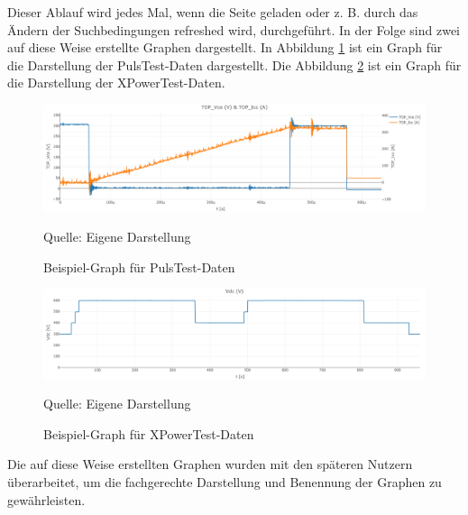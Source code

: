 Dieser Ablauf wird jedes Mal, wenn die Seite geladen oder z. B. durch das Ändern der Suchbedingungen refreshed wird, durchgeführt.
In der Folge sind zwei auf diese Weise erstellte Graphen dargestellt.
In Abbildung \ref{fig:Beispiel-Graph für PulsTest-Daten} ist ein Graph für die Darstellung der PulsTest-Daten dargestellt.
Die Abbildung \ref{fig:Beispiel-Graph für XPowerTest-Daten} ist ein Graph für die Darstellung der XPowerTest-Daten.

\begin{figure}[H]
    \centering
    \includegraphics[width=1\textwidth]{Grafiken/newplot.png}
    \caption{Beispiel-Graph für PulsTest-Daten}
    \label{fig:Beispiel-Graph für PulsTest-Daten}
    {Quelle: Eigene Darstellung}
\end{figure}

\begin{figure}[H]
    \centering
    \includegraphics[width=1\textwidth]{Grafiken/newplot (1).png}
    \caption{Beispiel-Graph für XPowerTest-Daten}
    \label{fig:Beispiel-Graph für XPowerTest-Daten}
    {Quelle: Eigene Darstellung}
\end{figure}

Die auf diese Weise erstellten Graphen wurden mit den späteren Nutzern überarbeitet, um die fachgerechte Darstellung und Benennung der Graphen zu gewährleisten.

